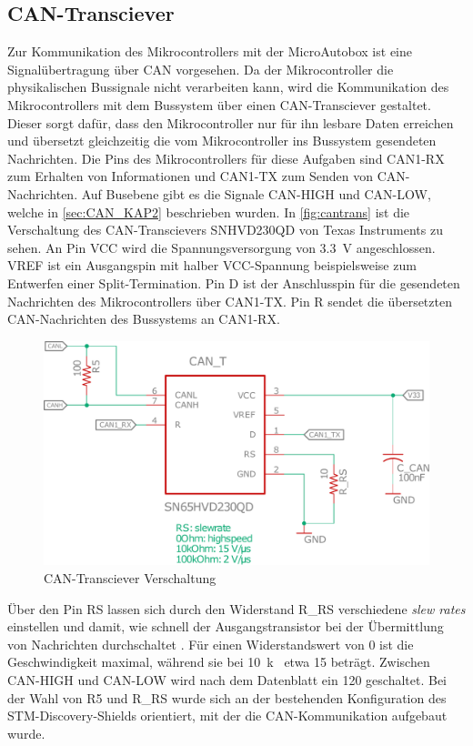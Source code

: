 \subsection{CAN-Transciever}
Zur Kommunikation des Mikrocontrollers mit der MicroAutobox ist eine Signalübertragung über CAN vorgesehen. Da der Mikrocontroller die physikalischen Bussignale nicht verarbeiten kann, wird die Kommunikation des Mikrocontrollers mit dem Bussystem über einen CAN-Transciever gestaltet. Dieser sorgt dafür, dass den Mikrocontroller nur für ihn lesbare Daten erreichen und übersetzt gleichzeitig die vom Mikrocontroller ins Bussystem gesendeten Nachrichten. Die Pins des Mikrocontrollers für diese Aufgaben sind CAN1-RX zum Erhalten von Informationen und CAN1-TX zum Senden von CAN-Nachrichten. Auf Busebene gibt es die Signale CAN-HIGH und CAN-LOW, welche in \autoref{sec:CAN_KAP2} beschrieben wurden. In \autoref{fig:cantrans} ist die Verschaltung des CAN-Transcievers SNHVD230QD von Texas Instruments zu sehen. An Pin VCC wird die Spannungsversorgung von \SI{3,3}{V} angeschlossen. VREF ist ein Ausgangspin mit halber VCC-Spannung beispielsweise zum Entwerfen einer Split-Termination. Pin D ist der Anschlusspin für die gesendeten Nachrichten des Mikrocontrollers über CAN1-TX. Pin R sendet die übersetzten CAN-Nachrichten des Bussystems an CAN1-RX.
\begin{figure}[H]%
\centering
\includegraphics[width=400pt]{./Bilder/can.pdf}%
\caption{CAN-Transciever Verschaltung}%
\label{fig:cantrans}%
\end{figure}\noindent
Über den Pin RS lassen sich durch den Widerstand R\_RS verschiedene \textit{slew rates} einstellen und damit, wie schnell der Ausgangstransistor bei der Übermittlung von Nachrichten durchschaltet \cite[S. 2]{cantrans}. Für einen Widerstandswert von \SI{0}{\Omega} ist die Geschwindigkeit maximal, während sie bei \SI{10}{k\Omega} etwa \SI{15}{} beträgt. Zwischen CAN-HIGH und CAN-LOW wird nach dem Datenblatt ein \SI{120}{\Omega} geschaltet. Bei der Wahl von R5 und R\_RS wurde sich an der bestehenden Konfiguration des STM-Discovery-Shields orientiert, mit der die CAN-Kommunikation aufgebaut wurde. 

